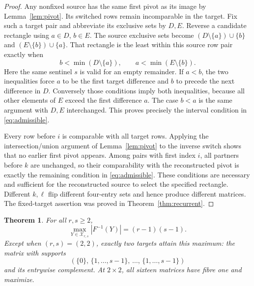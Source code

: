 \documentclass[a4paper,10pt]{amsart}
\newtheorem{theorem}{Theorem}[section]
\theoremstyle{remark}
\newcommand{\X}{\mathcal X}
\begin{document}
\begin{proof}
Any nonfixed source has the same first pivot as its image by
Lemma~\ref{lem:pivot}. Its switched rows remain incomparable in the
target. Fix such a target pair and abbreviate its exclusive sets by
$D,E$. Reverse a candidate rectangle using $a\in D$, $b\in E$.
The source exclusive sets become
$(D\setminus\{a\})\cup\{b\}$ and
$(E\setminus\{b\})\cup\{a\}$.
That rectangle is the least within this source row pair exactly when
\begin{equation}\label{eq:minima}
 b<\min(D\setminus\{a\}),\qquad
 a<\min(E\setminus\{b\}).
\end{equation}
Here the same sentinel $s$ is valid for an empty remainder.
If $a<b$, the two inequalities force $a$ to be the first target
difference and $b$ to precede the next difference in $D$. Conversely
those conditions imply both inequalities, because all other elements
of $E$ exceed the first difference $a$. The case $b<a$ is the same
argument with $D,E$ interchanged. This proves precisely the interval
condition in \eqref{eq:admissible}.

Every row before $i$ is comparable with all target rows. Applying the
intersection/union argument of Lemma~\ref{lem:pivot} to the inverse
switch shows that no earlier first pivot appears. Among pairs with
first index $i$, all partners before $k$ are unchanged, so their
comparability with the reconstructed pivot is exactly the remaining
condition in \eqref{eq:admissible}. These conditions are necessary and
sufficient for the reconstructed source to select the specified
rectangle. Different $k,\ell$ flip different four-entry sets and hence
produce different matrices. The fixed-target assertion was proved in
Theorem~\ref{thm:recurrent}.
\end{proof}

\begin{theorem}\label{thm:maximum}
For all $r,s\ge2$,
\[
 \max_{Y\in\X_{r,s}}|F^{-1}(Y)|=(r-1)(s-1).
\]
Except when $(r,s)=(2,2)$, exactly two targets attain this maximum:
the matrix with supports
\begin{equation}\label{eq:maximizers}
 (\{0\},\,\{1,\ldots,s-1\},\,\ldots,\,\{1,\ldots,s-1\})
\end{equation}
and its entrywise complement. At $2\times2$, all sixteen matrices
have fibre one and maximize.
\end{theorem}
\end{document}
